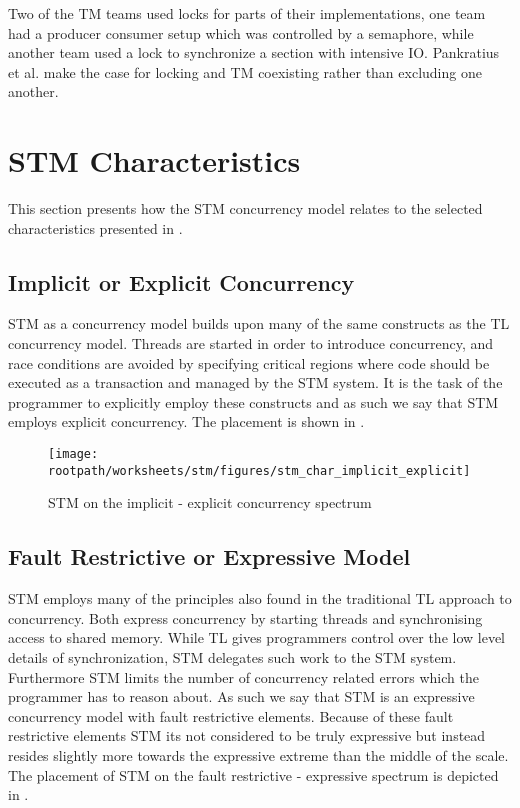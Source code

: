 Two of the \ac{TM} teams used locks for parts of their implementations, one team had a producer consumer setup which was controlled by a semaphore, while another team used a lock to synchronize a section with intensive \ac{IO}\cite[p. 5]{pankratius2009does}. Pankratius et al. make the case for locking and \ac{TM} coexisting rather than excluding one another.

\section{\acs{STM} Characteristics}
\label{sec:stm_eval}
This section presents how the \ac{STM} concurrency model relates to the selected characteristics presented in .

\subsection{Implicit or Explicit Concurrency}
\ac{STM} as a concurrency model builds upon many of the same constructs as the \ac{TL} concurrency model. Threads are started in order to introduce concurrency, and race conditions are avoided by specifying critical regions where code should be executed as a transaction and managed by the \ac{STM} system. It is the task of the programmer to explicitly employ these constructs and as such we say that \ac{STM} employs explicit concurrency. The placement is shown in .

\begin{figure}[htbp]
\centering
 \texttt{[image: \\rootpath/worksheets/stm/figures/stm\_char\_implicit\_explicit]} 
 \caption{\ac{STM} on the implicit - explicit concurrency spectrum}
\label{fig:stm_char_impli_expli}
\end{figure}

\subsection{Fault Restrictive or Expressive Model}
\ac{STM} employs many of the principles also found in the traditional \ac{TL} approach to concurrency. Both express concurrency by starting threads and synchronising access to shared memory. While \ac{TL} gives programmers control over the low level details of synchronization, \ac{STM} delegates such work to the \ac{STM} system. Furthermore \ac{STM} limits the number of concurrency related errors which the programmer has to reason about. As such we say that \ac{STM} is an expressive concurrency model with fault restrictive elements. Because of these fault restrictive elements \ac{STM} its not considered to be truly expressive but instead resides slightly more towards the expressive extreme than the middle of the scale. The placement of \ac{STM} on the fault restrictive - expressive spectrum is depicted in .

